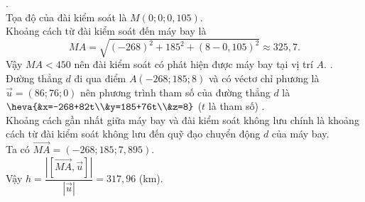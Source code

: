 \begin{ex}
{\begin{itemchoice}
			.\\
			Tọa độ của đài kiểm soát là $M(0;0;0{,}105)$.\\
			Khoảng cách từ đài kiểm soát đến máy bay là
			$$
			MA=\sqrt{(-268)^2+185^2+(8-0{,}105)^2}\approx 325{,}7.
			$$
			Vậy $MA<450$ nên đài kiểm soát có phát hiện được máy bay tại vị trí $A$.
			.\\
			Đường thẳng $d$ đi qua điểm $A(-268;185;8)$ và có véctơ chỉ phương là $\overrightarrow{u}=(86;76;0)$ nên phương trình tham số của đường thẳng $d$ là $\heva{&x=-268+82t\\&y=185+76t\\&z=8}$ ($t$ là tham số)
			.\\
			Khoảng cách gần nhất giữa máy bay và đài kiểm soát không lưu chính là khoảng cách từ đài kiểm soát không lưu đến quỹ đạo chuyển động $d$ của máy bay.\\
			Ta có $\overrightarrow{MA}=(-268;185;7{,}895)$.\\
			Vậy $h=\dfrac{\left|\left[\overrightarrow{MA},\overrightarrow{u}\right]\right|}{|\overrightarrow{u}|}=317{,}96$ (km).
	\end{itemchoice}
	}
\end{ex}

